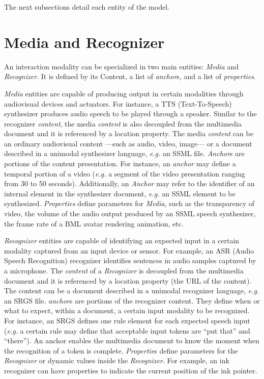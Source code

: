 The next subsections detail each entity of the model.

\section{Media and Recognizer}
\label{sec:approuach:node} An interaction modality can be specialized in two
main entities: \textit{Media} and
\textit{Recognizer}. It is defined by its Content, a list of \textit{anchor}s,
and a list of \textit{properties}.

\textit{Media} entities are capable of producing output in certain modalities
through audiovisual devices and actuators. For instance, a TTS (Text-To-Speech)
synthesizer produces audio speech to be played through a speaker. Similar to the
recognizer \textit{content}, the media \textit{content} is also decoupled from
the multimedia document and it is referenced by a location property. The media
\textit{content} can be an ordinary audiovisual content —such as audio, video,
image— or a document described in a unimodal synthesizer language, \textit{e.g.} an SSML
file. \textit{Anchor}s are portions of the content presentation. For instance,
an \textit{anchor} may define a temporal portion of a video (\textit{e.g.} a segment of
the video presentation ranging from 30 to 50 seconds). Additionally, an
\textit{Anchor} may refer to the identifier of an internal element in the
synthesizer document, \textit{e.g.} an SSML element to be synthesized. \textit{Properties}
define parameters for \textit{Media}, such as the transparency of video, the
volume of the audio output produced by an SSML speech synthesizer, the frame
rate of a BML avatar rendering animation, etc.

\textit{Recognizer} entities are capable of identifying an expected input in a
certain modality captured from an input device or sensor. For example, an ASR
(Audio Speech Recognition) recognizer identifies sentences in audio samples
captured by a microphone. The \textit{content} of a \textit{Recognizer} is
decoupled from the multimedia document and it is referenced by a location
property (the URL of the content). The content can be a document described in a
unimodal recognizer language, \textit{e.g.} an SRGS file. \textit{anchor}s are portions
of the recognizer content. They define when or what to expect, within a
document, a certain input modality to be recognized. For instance, an SRGS
defines one rule element for each expected speech input (\textit{e.g.} a certain rule may
define that acceptable input tokens are “put that” and “there”). An anchor
enables the multimedia document to know the moment when the recognition of a
token is complete. \textit{Propertie}s define parameters for the
\textit{Recognizer} or dynamic values inside the \textit{Recognizer}. For
example, an ink recognizer can have properties to indicate the current position
of the ink pointer.

